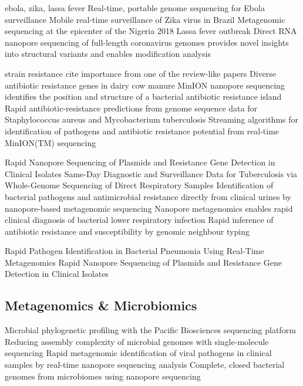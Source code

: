 ebola, zika, lassa fever
Real-time, portable genome sequencing for Ebola surveillance \cite{Quick2016}
Mobile real-time surveillance of Zika virus in Brazil \cite{Faria2016}
Metagenomic sequencing at the epicenter of the Nigeria 2018 Lassa fever outbreak \cite{Kafetzopoulou2019}
Direct RNA nanopore sequencing of full-length coronavirus genomes provides novel insights into structural variants and enables modification analysis \cite{Viehweger2019}

strain resistance
cite importance from one of the review-like papers
Diverse antibiotic resistance genes in dairy cow manure \cite{Wichmann2014}
MinION nanopore sequencing identifies the position and structure of a bacterial antibiotic resistance island \cite{Ashton2015}
Rapid antibiotic-resistance predictions from genome sequence data for Staphylococcus aureus and Mycobacterium tuberculosis \cite{Bradley2015}
Streaming algorithms for identification of pathogens and antibiotic resistance potential from real-time MinION(TM) sequencing \cite{Cao2016}

Rapid Nanopore Sequencing of Plasmids and Resistance Gene Detection in Clinical Isolates \cite{Lemon2017}
Same-Day Diagnostic and Surveillance Data for Tuberculosis via Whole-Genome Sequencing of Direct Respiratory Samples \cite{Votintseva2017}
Identification of bacterial pathogens and antimicrobial resistance directly from clinical urines by nanopore-based metagenomic sequencing \cite{Schmidt2017}
Nanopore metagenomics enables rapid clinical diagnosis of bacterial lower respiratory infection \cite{Charalampous2019}
Rapid inference of antibiotic resistance and susceptibility by genomic neighbour typing \cite{Brinda2020}

Rapid Pathogen Identification in Bacterial Pneumonia Using Real-Time Metagenomics \cite{Pendleton2017}
Rapid Nanopore Sequencing of Plasmids and Resistance Gene Detection in Clinical Isolates \cite{Lemon2017}




\subsection{Metagenomics \& Microbiomics}
\label{subsec:state_of_art:metagenomics}

Microbial phylogenetic profiling with the Pacific Biosciences sequencing platform \cite{Fichot2013}
Reducing assembly complexity of microbial genomes with single-molecule sequencing \cite{Koren2013}
Rapid metagenomic identification of viral pathogens in clinical samples by real-time nanopore sequencing analysis \cite{Greninger2015}
Complete, closed bacterial genomes from microbiomes using nanopore sequencing \cite{Moss2020}

